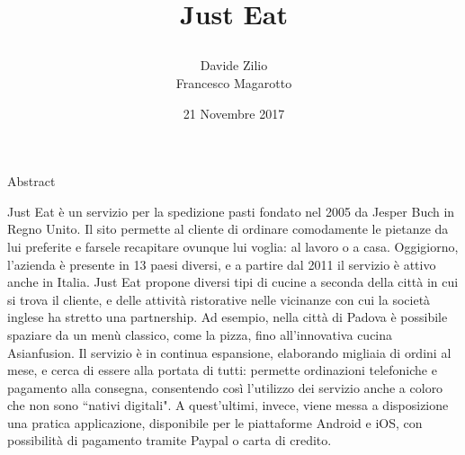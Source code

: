 \documentclass[10pt]{article}
\title{\begin{Huge}Just Eat\end{Huge}}
\author{Davide Zilio\\Francesco Magarotto}
\date{21 Novembre 2017}
\begin{document}
	\maketitle
	\begin{large}
		\begin{center}
			\LARGE Abstract
		\end{center}
	\begin{linenumbers}
	Just Eat \`e un servizio per la spedizione pasti fondato nel 2005 da Jesper Buch in Regno Unito. Il sito permette al cliente di ordinare comodamente le pietanze da lui preferite e farsele recapitare ovunque lui voglia: al lavoro o a casa. 
	Oggigiorno, l'azienda \`e presente in 13 paesi diversi, e a partire dal 2011 il servizio \`e  attivo anche in Italia. Just Eat propone diversi tipi di cucine a seconda della citt\`a in cui si trova il cliente, e delle attivit\`a ristorative nelle vicinanze con cui la società inglese ha stretto una partnership. Ad esempio, nella citt\`a di Padova \`e possibile spaziare da un men\`u classico, come la pizza, fino all'innovativa cucina Asianfusion. Il servizio \`e in continua espansione, elaborando migliaia di ordini al mese, e cerca di essere alla portata di tutti: permette ordinazioni telefoniche e pagamento alla consegna, consentendo cos\`i l'utilizzo dei servizio anche a coloro che non sono ``nativi digitali". A quest'ultimi, invece, viene messa a disposizione una pratica applicazione, disponibile per le piattaforme Android\texttrademark{} e iOS\texttrademark{}, con possibilit\`a di pagamento tramite Paypal\texttrademark{}  o carta di credito. 
	\end{linenumbers}
	\end{large}
	\pagebreak
	\tableofcontents{}
	\pagebreak
\end{document}
